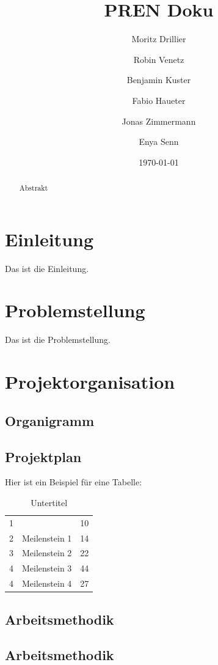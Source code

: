 \documentclass{article}
\title{PREN Doku}
\author{Moritz Drillier \and Robin Venetz \and Benjamin Kuster \and Fabio Haueter \and Jonas Zimmermann \and Enya Senn}
\date{\thedate}
\begin{document}
\maketitle

\tableofcontents 

\begin{abstract}
Abstrakt
\end{abstract}

\section{Einleitung}
Das ist die Einleitung.
\section{Problemstellung}
Das ist die Problemstellung.
\section{Projektorganisation}

\subsection{Organigramm}

\subsection{Projektplan}
Hier ist ein Beispiel für eine Tabelle:

\begin{table}[H] %
    \centering
    \begin{tabular}{clr}
        1 & \date{\today} & 10 \\
        2 & Meilenstein 1 & 14 \\
        3 & Meilenstein 2  & 22 \\
        4 & Meilenstein 3  & 44 \\
        4 & Meilenstein 4  & 27 \\
    \end{tabular}
    \caption{Untertitel}
    \label{tab:my_label}
\end{table}

\subsection{Arbeitsmethodik}

\subsection{Arbeitsmethodik}
\end{document}
